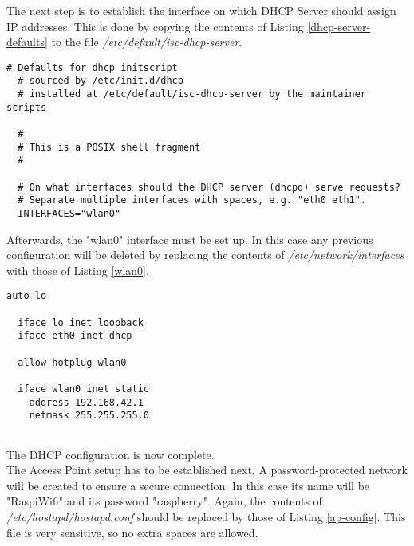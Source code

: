 \bigskip
The next step is to establish the interface on which DHCP Server should assign IP addresses. This is done by copying the contents of Listing \ref{dhcp-server-defaults} to the file \textit{/etc/default/isc-dhcp-server}.\\

	\begin{minipage}{\linewidth}%
	\begin{lstlisting}[label=dhcp-server-defaults,caption=DHCP Server Defaults {[} /etc/default/isc-dhcp-server {]}  ]
  # Defaults for dhcp initscript
  # sourced by /etc/init.d/dhcp
  # installed at /etc/default/isc-dhcp-server by the maintainer scripts

  #
  # This is a POSIX shell fragment
  #

  # On what interfaces should the DHCP server (dhcpd) serve requests?
  # Separate multiple interfaces with spaces, e.g. "eth0 eth1".
  INTERFACES="wlan0"
	\end{lstlisting}
	\end{minipage}

\bigskip
Afterwards, the "wlan0" interface must be set up. In this case any previous configuration will be deleted by replacing the contents of \textit{/etc/network/interfaces} with those of Listing \ref{wlan0}.\\

	\begin{minipage}{\linewidth}%
	\begin{lstlisting}[label=wlan0,caption=Interface Configuration {[} /etc/dnetwork/interfaces {]}  ]
  auto lo

  iface lo inet loopback
  iface eth0 inet dhcp

  allow hotplug wlan0

  iface wlan0 inet static
    address 192.168.42.1
    netmask 255.255.255.0
	
	\end{lstlisting}
	\end{minipage}

\bigskip
The DHCP configuration is now complete.\\

The Access Point setup has to be established next. A password-protected network will be created to ensure a secure connection. In this case its name will be "RaspiWifi" and its password "raspberry". Again, the contents of \textit{/etc/hostapd/hostapd.conf} should be replaced by those of Listing \ref{ap-config}. This file is very sensitive, so no extra spaces are allowed.\\

